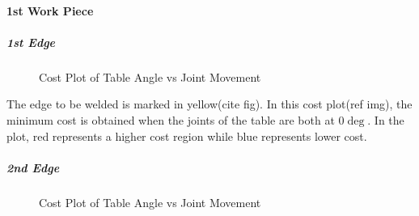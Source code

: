 \paragraph{1st Work Piece}
\subparagraph{1st Edge}

\begin{figure}[!htbp] %
 \centering
   \caption{Cost Plot of Table Angle vs Joint Movement}
\label{fig:img17}
\end{figure}
The edge to be welded is marked in yellow(cite fig). In this cost plot(ref img), the minimum cost is obtained when the joints of the table are both at 0$\deg$. In the plot, red represents a higher cost region while blue represents lower cost.
\subparagraph{2nd Edge}
\begin{figure}[!htbp] %
 \centering
   \caption{Cost Plot of Table Angle vs Joint Movement}
\label{fig:img18}
\end{figure}
